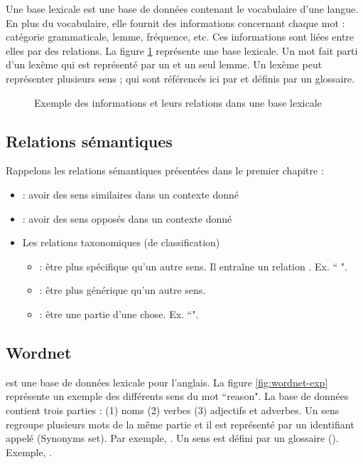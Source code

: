 \documentclass{KodeBook}
\begin{document}
Une base lexicale est une base de données contenant le vocabulaire d'une langue. 
En plus du vocabulaire, elle fournit des informations concernant chaque mot : catégorie grammaticale, lemme, fréquence, etc.
Ces informations sont liées entre elles par des relations. 
La figure \ref{fig:base-lex-exp} représente une base lexicale.
Un mot fait parti d'un lexème qui est représenté par un et un seul lemme. 
Un lexème peut représenter plusieurs sens ; qui sont référencés ici par  et définis par un glossaire.
 
\begin{figure}[ht]
	\centering 
	\caption[Exemple des informations et leurs relations dans une base lexicale]{Exemple des informations et leurs relations dans une base lexicale \cite{2019-white-al}}
	\label{fig:base-lex-exp}
\end{figure}

\subsection{Relations sémantiques}

Rappelons les relations sémantiques présentées dans le premier chapitre :
\begin{itemize}
	\item {} : avoir des sens similaires dans un contexte donné
	\item {} : avoir des sens opposés dans un contexte donné
	\item Les relations taxonomiques (de classification)
	\begin{itemize}
		\item {} : être plus spécifique qu'un autre sens. Il entraîne un relation . Ex. `` ".
		\item {} : être plus générique qu'un autre sens. 
		\item {} : être une partie d'une chose. Ex. ``".
	\end{itemize}
\end{itemize}

\subsection{Wordnet}

 \cite{1995-miller} est une base de données lexicale pour l'anglais.
La figure \ref{fig:wordnet-exp} représente un exemple des différents sens du mot ``reason". 
La base de données contient trois parties : (1) noms (2) verbes (3) adjectifs et adverbes. 
Un sens regroupe plusieurs mots de la même partie et il est représenté par un identifiant appelé  (Synonyms set).
Par exemple, .
Un sens est défini par un glossaire ().
Exemple, .
\end{document}
